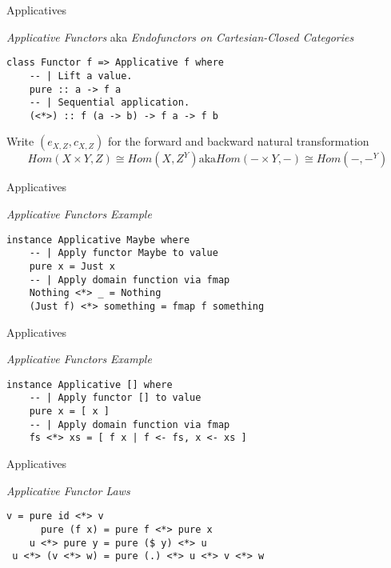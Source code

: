\documentclass[10pt]{beamer}
\theoremstyle{definition}
\theoremstyle{remark}
\numberwithin{equation}{section}
\begin{document}
\begin{frame}[fragile]{Applicatives}

  \emph{Applicative Functors}
  aka \emph{Endofunctors on Cartesian-Closed Categories}

  \begin{lstlisting}[frame=single]
class Functor f => Applicative f where
    -- | Lift a value.
    pure :: a -> f a
    -- | Sequential application.
    (<*>) :: f (a -> b) -> f a -> f b
  \end{lstlisting}

  Write $(e_{X,Z},c_{X,Z})$ for the forward and backward natural transformation
  \begin{equation}
    Hom(X\times Y,Z) \cong Hom(X,Z^Y) \mathrm{aka} Hom(- \times Y,-) \cong Hom(-,-^Y)
  \end{equation}
  
\end{frame}

\begin{frame}[fragile]{Applicatives}

  \emph{Applicative Functors Example}

  \begin{lstlisting}[frame=single]
instance Applicative Maybe where
    -- | Apply functor Maybe to value
    pure x = Just x
    -- | Apply domain function via fmap
    Nothing <*> _ = Nothing
    (Just f) <*> something = fmap f something
  \end{lstlisting}

\end{frame}

\begin{frame}[fragile]{Applicatives}

  \emph{Applicative Functors Example}

  \begin{lstlisting}[frame=single]
instance Applicative [] where
    -- | Apply functor [] to value
    pure x = [ x ]
    -- | Apply domain function via fmap
    fs <*> xs = [ f x | f <- fs, x <- xs ]
  \end{lstlisting}

\end{frame}

\begin{frame}[fragile]{Applicatives}

  \emph{Applicative Functor Laws}

  \begin{lstlisting}[frame=single]
               v = pure id <*> v
      pure (f x) = pure f <*> pure x
    u <*> pure y = pure ($ y) <*> u
 u <*> (v <*> w) = pure (.) <*> u <*> v <*> w
  \end{lstlisting}

\end{frame}
\end{document}
